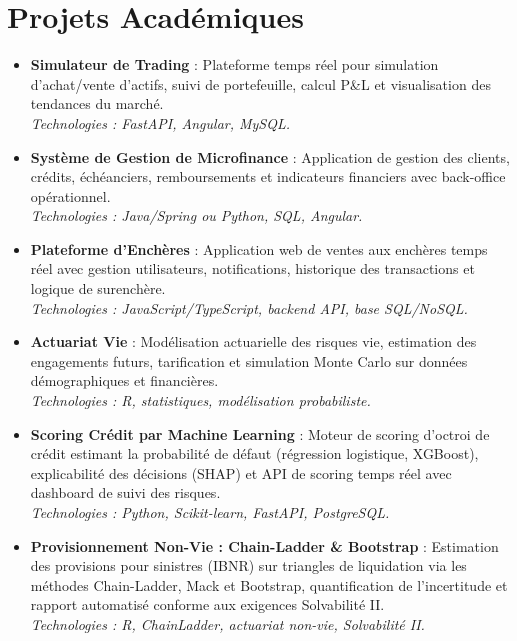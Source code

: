 \documentclass[10pt,a4paper]{article}
\begin{document}
\section{Projets Académiques}
\begin{itemize}
    \item \textbf{Simulateur de Trading} : Plateforme temps réel pour simulation d'achat/vente d'actifs, suivi de portefeuille, calcul P\&L et visualisation des tendances du marché.\\
    \textit{Technologies : FastAPI, Angular, MySQL.}
    \item \textbf{Système de Gestion de Microfinance} : Application de gestion des clients, crédits, échéanciers, remboursements et indicateurs financiers avec back-office opérationnel.\\
    \textit{Technologies : Java/Spring ou Python, SQL, Angular.}
    \item \textbf{Plateforme d'Enchères} : Application web de ventes aux enchères temps réel avec gestion utilisateurs, notifications, historique des transactions et logique de surenchère.\\
    \textit{Technologies : JavaScript/TypeScript, backend API, base SQL/NoSQL.}
    \item \textbf{Actuariat Vie} : Modélisation actuarielle des risques vie, estimation des engagements futurs, tarification et simulation Monte Carlo sur données démographiques et financières.\\
    \textit{Technologies : R, statistiques, modélisation probabiliste.}
    \item \textbf{Scoring Crédit par Machine Learning} : Moteur de scoring d'octroi de crédit estimant la probabilité de défaut (régression logistique, XGBoost), explicabilité des décisions (SHAP) et API de scoring temps réel avec dashboard de suivi des risques.\\
    \textit{Technologies : Python, Scikit-learn, FastAPI, PostgreSQL.}
    \item \textbf{Provisionnement Non-Vie : Chain-Ladder \& Bootstrap} : Estimation des provisions pour sinistres (IBNR) sur triangles de liquidation via les méthodes Chain-Ladder, Mack et Bootstrap, quantification de l'incertitude et rapport automatisé conforme aux exigences Solvabilité II.\\
    \textit{Technologies : R, ChainLadder, actuariat non-vie, Solvabilité II.}
\end{itemize}

\end{document}
